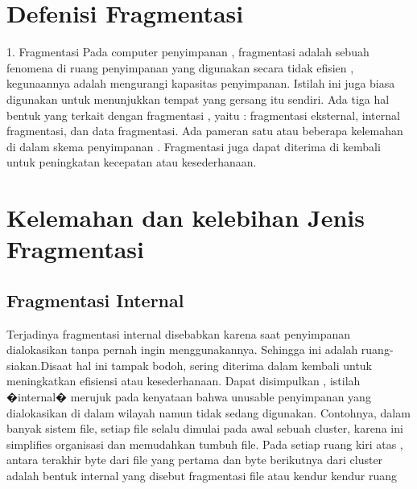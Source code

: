\section{Defenisi Fragmentasi}
1. Fragmentasi
Pada computer penyimpanan  , fragmentasi adalah sebuah fenomena di ruang penyimpanan yang digunakan secara tidak efisien , kegunaannya adalah mengurangi kapasitas penyimpanan. Istilah ini juga biasa digunakan untuk menunjukkan tempat yang gersang itu sendiri.
Ada tiga hal bentuk yang terkait dengan fragmentasi , yaitu : fragmentasi eksternal, internal fragmentasi, dan data fragmentasi. Ada pameran satu atau beberapa kelemahan di dalam skema penyimpanan . Fragmentasi juga dapat diterima di kembali untuk peningkatan kecepatan atau kesederhanaan.

\section {Kelemahan dan kelebihan Jenis Fragmentasi}

\subsection{Fragmentasi Internal}
Terjadinya fragmentasi internal disebabkan karena saat penyimpanan dialokasikan tanpa pernah ingin menggunakannya. Sehingga ini adalah ruang-siakan.Disaat hal ini tampak bodoh, sering diterima dalam kembali untuk meningkatkan efisiensi atau kesederhanaan. Dapat disimpulkan , istilah �internal� merujuk pada kenyataan bahwa unusable penyimpanan yang dialokasikan di dalam wilayah namun tidak sedang digunakan. Contohnya, dalam banyak sistem file, setiap file selalu dimulai pada awal sebuah cluster, karena ini simplifies organisasi dan memudahkan tumbuh file. Pada setiap ruang kiri atas , antara terakhir byte dari file yang pertama dan byte berikutnya dari cluster adalah bentuk internal yang disebut fragmentasi file atau kendur kendur ruang

